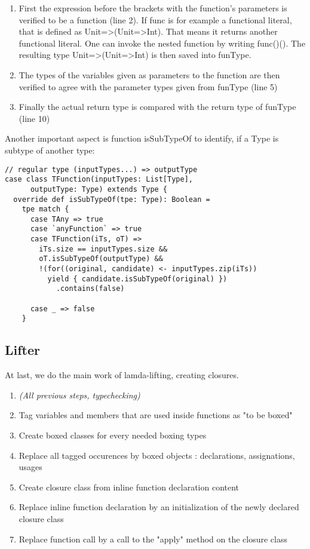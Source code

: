 \begin{enumerate}
\item First the expression before the brackets with the function's parameters is verified to be a function (line 2). If func is for example a functional literal, that is defined as Unit=\textgreater(Unit=\textgreater Int). That means it returns another functional literal. One can invoke the nested function by writing func()(). The resulting type Unit=\textgreater(Unit=\textgreater Int) is then saved into funType.
\item The types of the variables given as parameters to the function are then verified to agree with the parameter types given from funType (line 5)
\item Finally the actual return type is compared with the return type of funType (line 10)
\end{enumerate}


Another important aspect is function isSubTypeOf to identify, if a Type is subtype of another type:

\begin{lstlisting}
// regular type (inputTypes...) => outputType
case class TFunction(inputTypes: List[Type],
      outputType: Type) extends Type {
  override def isSubTypeOf(tpe: Type): Boolean =
    tpe match {
      case TAny => true
      case `anyFunction` => true
      case TFunction(iTs, oT) => 
        iTs.size == inputTypes.size && 
        oT.isSubTypeOf(outputType) && 
    	!(for((original, candidate) <- inputTypes.zip(iTs))
          yield { candidate.isSubTypeOf(original) })
            .contains(false)
    		  	
      case _ => false
    }
\end{lstlisting}

\subsection{Lifter}
At last, we do the main work of lamda-lifting, creating closures.
\begin{enumerate}
\item \emph{(All previous steps, typechecking)}
\item Tag variables and members that are used inside functions as "to be boxed"
\item Create boxed classes for every needed boxing types
\item Replace all tagged occurences by boxed objects : declarations, assignations, usages
\item Create closure class from inline function declaration content
\item Replace inline function declaration by an initialization of the newly declared closure class
\item Replace function call by a call to the "apply" method on the closure class
\end{enumerate}



